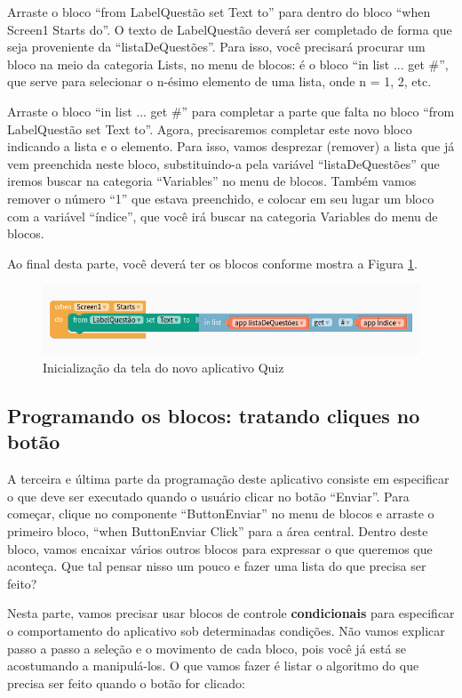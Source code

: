 \documentclass[11pt,fleqn]{book} %
\begin{document}
Arraste o bloco ``from LabelQuestão set Text to'' para dentro do bloco ``when Screen1 Starts do''. O texto de LabelQuestão deverá ser completado de forma que seja proveniente da ``listaDeQuestões''. Para isso, você precisará procurar um bloco na meio da categoria Lists, no menu de blocos:  é o bloco ``in list ... get \#'', que serve para selecionar o n-ésimo elemento de uma lista, onde n = 1, 2, etc. 

Arraste o bloco ``in list ... get \#'' para completar a parte que falta no bloco ``from LabelQuestão set Text to''. Agora, precisaremos completar este novo bloco indicando a lista e o elemento. Para isso, vamos desprezar (remover) a lista que já vem preenchida neste bloco, substituindo-a pela variável ``listaDeQuestões'' que iremos buscar na categoria ``Variables'' no menu de blocos. Também vamos remover o número ``1'' que estava preenchido, e colocar em seu lugar um bloco com a variável ``índice'', que você irá buscar na categoria Variables do menu de blocos.

Ao final desta parte, você deverá ter os blocos conforme mostra a Figura \ref{fig:extraquizinit}.


\begin{figure}[H]
	\centering
    \includegraphics[width=\textwidth]{Pictures/GuiaThunkExtraQuizInit.png}
    \caption{Inicialização da tela do novo aplicativo Quiz}\label{fig:extraquizinit}
\end{figure}


\subsection{Programando os blocos: tratando cliques no botão}

A terceira e última parte da programação deste aplicativo consiste em especificar o que deve ser executado quando o usuário clicar no botão ``Enviar''. Para começar, clique no componente ``ButtonEnviar'' no menu de blocos e arraste o primeiro bloco, ``when ButtonEnviar Click'' para a área central. Dentro deste bloco, vamos encaixar vários outros blocos para expressar o que queremos que aconteça. Que tal pensar nisso um pouco e fazer uma lista do que precisa ser feito?

Nesta parte, vamos precisar usar blocos de controle \textbf{condicionais} para especificar o comportamento do aplicativo sob determinadas condições.
Não vamos explicar passo a passo a seleção e o movimento de cada bloco, pois você já está se acostumando a manipulá-los. O que vamos fazer é listar o algoritmo do que precisa ser feito quando o botão for clicado:
\end{document}
